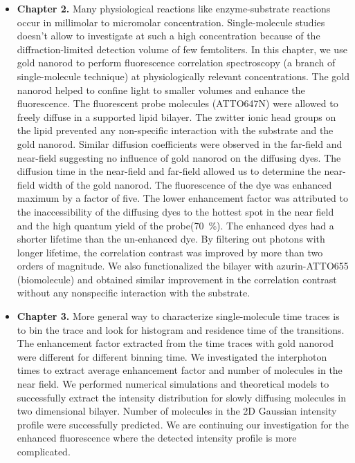 \begin{itemize}
	\item \textbf{Chapter 2.} Many physiological reactions like enzyme-substrate reactions occur in millimolar to micromolar concentration. Single-molecule studies doesn't allow to investigate at such a high concentration because of the diffraction-limited detection volume of few femtoliters. In this chapter, we use gold nanorod to perform fluorescence correlation spectroscopy (a branch of single-molecule technique) at physiologically relevant concentrations. The gold nanorod helped to confine light to smaller volumes and enhance the fluorescence. The fluorescent probe molecules (ATTO647N) were allowed to freely diffuse in a supported lipid bilayer. The zwitter ionic head groups on the lipid prevented any non-specific interaction with the substrate and the gold nanorod. Similar diffusion coefficients were observed in the far-field and near-field suggesting no influence of gold nanorod on the diffusing dyes. The diffusion time in the near-field and far-field allowed us to determine the near-field width of the gold nanorod. The fluorescence of the dye was enhanced maximum by a factor of five. The lower enhancement factor was attributed to the inaccessibility of the diffusing dyes to the hottest spot in the near field and the high quantum yield of the probe(\SI{70}{\percent}).
	The enhanced dyes had a shorter lifetime than the un-enhanced dye. By filtering out photons with longer lifetime, the correlation contrast was improved by more than two orders of magnitude. We also functionalized the bilayer with azurin-ATTO655 (biomolecule) and obtained similar improvement in the correlation contrast without any nonspecific interaction with the substrate.

	\item \textbf{Chapter 3.} More general way to characterize single-molecule time traces is to bin the trace and look for histogram and residence time of the transitions. The enhancement factor extracted from the time traces with gold nanorod were different for different binning time. We investigated the interphoton times to extract average enhancement factor and number of molecules in the near field. We performed numerical simulations and theoretical models to successfully extract the intensity distribution for slowly diffusing molecules in two dimensional bilayer. Number of molecules in the 2D Gaussian intensity profile were successfully predicted. We are continuing our investigation for the enhanced fluorescence where the detected intensity profile is more complicated.
	

\end{itemize}
